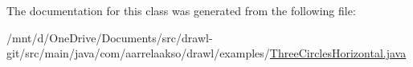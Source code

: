 The documentation for this class was generated from the following file\+:\begin{DoxyCompactItemize}
\item 
/mnt/d/\+One\+Drive/\+Documents/src/drawl-\/git/src/main/java/com/aarrelaakso/drawl/examples/\hyperlink{_three_circles_horizontal_8java}{Three\+Circles\+Horizontal.\+java}\end{DoxyCompactItemize}

